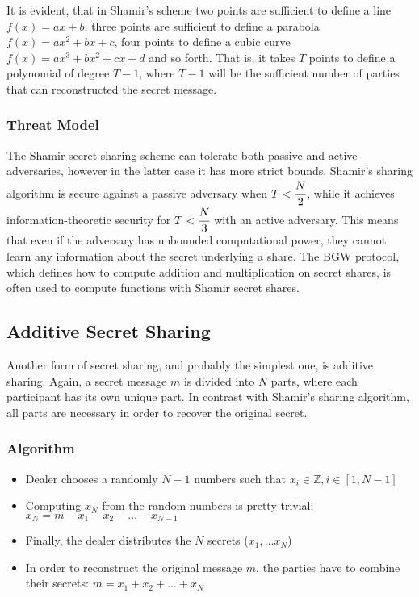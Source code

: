 It is evident, that in Shamir's scheme two points are sufficient to define a line $f(x) = ax + b$, three points are sufficient to define a parabola $f(x) = ax^2 + bx + c$, four points to define a cubic curve $f(x) = ax^3 + bx^2 + cx + d$ and so forth.
That is, it takes $T$ points to define a polynomial of degree $T-1$, where $T - 1$ will be the sufficient number of parties that can reconstructed the secret message.

\subsubsection{Threat Model}\label{sss:shamir-threat-model}
The Shamir secret sharing scheme can tolerate both passive and active adversaries, however in the latter case it has more strict bounds.
Shamir's sharing algorithm is secure against a passive adversary when $T < \cfrac{N}{2}$, while it achieves information-theoretic security for $T < \cfrac{N}{3}$ with an active adversary.
This means that even if the adversary has unbounded computational power, they cannot learn any information about the secret underlying a share.
The BGW \cite{brakerski2014leveled} protocol, which defines how to compute addition and multiplication on secret shares, is often used to compute functions with Shamir secret shares.



\subsection{Additive Secret Sharing}\label{ss:additive-secret-sharing}
Another form of secret sharing, and probably the simplest one, is additive sharing.
Again, a secret message $m$ is divided into $N$ parts, where each participant has its own unique part.
In contrast with Shamir's sharing algorithm, all parts are necessary in order to recover the original secret.

\subsubsection{Algorithm}\label{sss:additive-algorithm}
\begin{itemize}

  \item Dealer chooses a randomly $N − 1$ numbers such that $x_i \in \mathbb{Z}, i \in [1, N-1]$

  \item Computing $x_N$ from the random numbers is pretty trivial; $x_N = m - x_1 - x_2 - \dots - x_{N-1}$

  \item Finally, the dealer distributes the $N$ secrets ($x_1, \dots x_N$)

  \item In order to reconstruct the original message $m$, the parties have to combine their secrets: $m = x_1 + x_2 + \dots + x_N$
\end{itemize}

